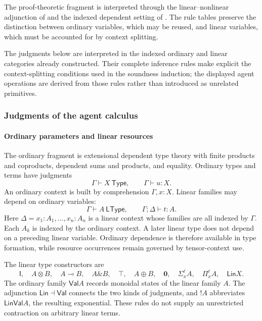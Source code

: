 \documentclass[11pt,a4paper]{article}
\numberwithin{equation}{section}
\theoremstyle{definition}
\theoremstyle{remark}
\theoremstyle{plain}
\providecommand{\Lin}{\mathsf{Lin}}
\providecommand{\Val}{\mathsf{Val}}
\providecommand{\I}{\mathsf{I}}
\providecommand{\Top}{\top}
\providecommand{\botell}{\mathbf{0}}
\providecommand{\ordturn}{\vdash}
\providecommand{\linturn}{\vdash}
\providecommand{\ltype}{\mathsf{LType}}
\providecommand{\type}{\mathsf{Type}}
\begin{document}
The proof-theoretic fragment is interpreted through the
linear--nonlinear adjunction of \citet{Benton1994MixedLNL} and the
indexed dependent setting of \citet{Vakar2015LinearFrameworks}.
The rule tables preserve the distinction between ordinary variables,
which may be reused, and linear variables, which must be accounted for
by context splitting.

The judgments below are interpreted in the indexed ordinary and
linear categories already constructed. Their complete inference rules
make explicit the context-splitting conditions used in the soundness
induction; the displayed agent operations are derived from those rules
rather than introduced as unrelated primitives.

\subsubsection{Judgments of the agent calculus}
\label{agt-sec-calculus}

\paragraph{Ordinary parameters and linear resources}

The ordinary fragment is extensional dependent type theory with finite
products and coproducts, dependent sums and products, and equality. Ordinary
types and terms have judgments
\[
 \Gamma\ordturn X\ \type,
 \qquad \Gamma\ordturn u:X.
\]
An ordinary context is built by comprehension $\Gamma,x:X$. Linear families
may depend on ordinary variables:
\[
 \Gamma\vdash A\ \ltype,
 \qquad \Gamma;\Delta\linturn t:A.
\]
Here $\Delta=x_1:A_1,\ldots,x_n:A_n$ is a linear context whose
families are all indexed by $\Gamma$. Each $A_k$ is indexed by the ordinary context. A later linear type does not
depend on a preceding linear variable. Ordinary dependence is therefore
available in type formation, while resource occurrences remain governed
by tensor-context use.

The linear type constructors are
\[
 \I,\quad A\otimes B,\quad A\multimap B,\quad
 A\mathbin{\&}B,\quad\Top,\quad A\oplus B,\quad\botell,
 \quad\Sigma_x^\ell A,\quad\Pi_x^\ell A,\quad\Lin X.
\]
The ordinary family $\Val A$ records monoidal states of the
linear family $A$. The adjunction $\Lin\dashv\Val$ connects the
two kinds of judgments, and $!A$ abbreviates $\Lin\Val A$, the
resulting exponential. These rules do not supply an unrestricted
contraction on arbitrary linear terms.
\end{document}
